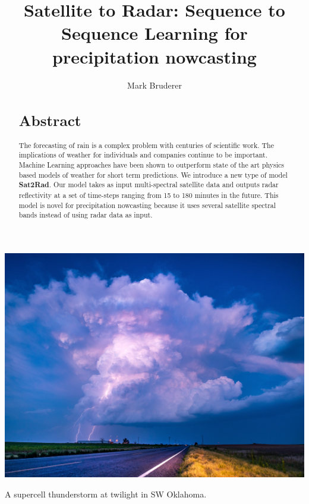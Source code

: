 \documentclass[acmtog, authorversion]{acmart}
\begin{document}
\title{Satellite to Radar: Sequence to Sequence Learning for precipitation nowcasting}

\author{Mark Bruderer}

\renewcommand{\shortauthors}{Mark Bruderer}

\begin{abstract}
\section*{Abstract}
The forecasting of rain is a complex problem with centuries of scientific work. The implications of weather for individuals and companies continue to be important. Machine Learning approaches have been shown to outperform state of the art physics based models of weather for short term predictions. We introduce a new type of model \textbf{Sat2Rad}. Our model takes as input multi-spectral satellite data and outputs radar reflectivity at a set of time-steps ranging from 15 to 180 minutes in the future. This model is novel for precipitation nowcasting because it uses several satellite spectral bands instead of using radar data as input.
\end{abstract}



\begin{teaserfigure}
  \includegraphics*[width=\textwidth, trim=0in 0.0in 0in 16.0in]{images/lightning.jpg}
  \caption{A supercell thunderstorm at twilight in SW Oklahoma.}
  \label{fig:teaser}
\end{teaserfigure}
\end{document}
